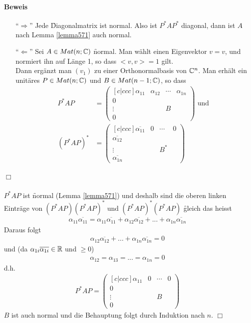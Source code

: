 \paragraph{Beweis}
\begin{itemize}
\item[``$\Rightarrow$''] Jede \f{Diagonalmatrix} ist normal. Also ist $P^{*} A P^{*}$ diagonal, dann ist $A$ nach Lemma \ref{lemma571} auch normal.

\item[``$\Leftarrow$''] Sei $A \in Mat(n; \mathbb{C})$ \f{normal}. Man wählt einen Eigenvektor $v= v$, und normiert ihn auf Länge 1, so dass $<v, v> = 1$ gilt. \\
Dann ergänzt man $(v_1)$ zu einer Orthonormalbasis von $\mathbb{C}^n$. Man erhält ein unitäres $P \in Mat(n; \mathbb{C})$ und $B \in Mat(n-1; \mathbb{C})$, so dass
\begin{align}
P^{*} A P &= \begin{pmatrix}[c|ccc] \alpha_{11} & \alpha_{12} & \cdots & \alpha_{1n} \\ 0 & & & \\ \vdots & & B & \\ 0 & & & \end{pmatrix} \text{ und} \\
(P^{*} A P)^{*} &= \begin{pmatrix}[c|ccc] \overline{\alpha_{11}} & 0 & \cdots & 0 \\ \overline{\alpha_{12}} & & & \\ \vdots & & B^{*} & \\ \overline{\alpha_{1n}} & & & \end{pmatrix}
\end{align}
\end{itemize}
\hfill $\Box$ \\\\
$P^{*} A P$ ist \f{normal} (Lemma \ref{lemma571}) und deshalb sind die oberen linken Einträge von $(P^{*} A P) (P^{*} A P)^{*}$ und $(P^{*} A P)^{*}(P^{*} A P)$
\f{gleich} das heisst
\begin{align}
\alpha_{11} \overline{\alpha_{11}} = \alpha_{11} \overline{\alpha_{11}} + \alpha_{12} \overline{\alpha_{12}} + ... + \alpha_{1n} \overline{\alpha_{1n}}
\end{align}
Daraus folgt
\begin{align}
\alpha_{12} \overline{\alpha_{12}} + ... + \alpha_{1n} \overline{\alpha_{1n}} = 0
\end{align}
und (da $\alpha_{1i} \overline{\alpha_{1i}} \in \mathbb{R}$ und $\geq 0$)
\begin{align}
\alpha_{12} = \alpha_{13} = ... =  \alpha_{1n} = 0
\end{align}
d.h.
\begin{align}
P^{*} A P = \begin{pmatrix}[c|ccc] \alpha_{11} & 0 & \cdots & 0 \\ 0 & & & \\ \vdots & & B & \\ 0 & & & \end{pmatrix}
\end{align}
$B$ ist auch normal und die Behauptung folgt durch Induktion nach $n$.
\hfill $\Box$

